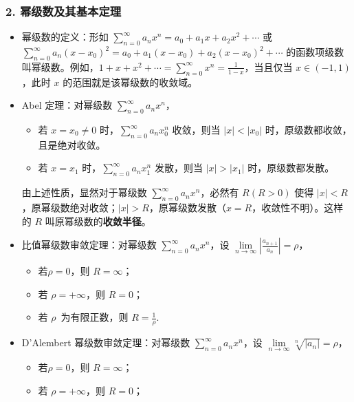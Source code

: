\documentclass[b5paper]{ctexart}
\newcommand{\mjst}{\sum \limits_{n = 0}^{\infty}}
\newcommand \jx[3]{\lim\limits_{#1 \to #2} #3}
\begin{document}
	\subsubsection*{2. 幂级数及其基本定理}
	
	\begin{itemize}
		\item 幂级数的定义：形如 $\mjst a_nx^n = a_0 + a_1 x + a_2 x^2 + \cdots$  或 $\mjst a_n (x - x_0 )^2 = a_0 + a_1 (x - x_0) + a_2 (x - x_0 )^2 + \cdots$ 的函数项级数叫幂级数。例如，$1 + x + x^2 + \cdots = \sum \limits_{n = 0}^{\infty} x^n = \frac{1}{1 - x}$，当且仅当 $x \in (-1, 1)$，此时 $x$ 的范围就是该幂级数的收敛域。
		
		\item Abel 定理：对幂级数 $\mjst a_n x^n$，
		
		\begin{itemize}
			\item 若 $x = x_0 \ne 0$ 时，$\mjst a_n x_0^n$ 收敛，则当 $|x| < |x_0|$ 时，原级数都收敛，且是绝对收敛。
			
			\item 若 $x = x_1$ 时，$\mjst a_n x_1^n$ 发散，则当 $|x| > |x_1|$ 时，原级数都发散。
		\end{itemize}
		
		由上述性质，显然对于幂级数 $\mjst a_n x^n$，必然有 $R(R > 0)$ 使得 $|x| < R$，原幂级数绝对收敛；$|x| > R$，原幂级数发散（$x = R$，收敛性不明）。这样的 $R$ 叫原幂级数的\textbf{收敛半径}。
		
		\item 比值幂级数审敛定理：对幂级数 $\mjst a_n x^n$，设 $\jx{n}{\infty}{|\frac{a_{n + 1}}{a_n}|} = \rho$，
			\begin{itemize}
				\item 若$\rho = 0$，则 $R = \infty$；
				
				\item 若 $\rho = +\infty$，则 $R = 0$；
				
				\item 若 $\rho  \enspace \mbox{为有限正数}$，则 $R = \frac{1}{\rho}$.
			\end{itemize}
		
		\item D'Alembert 幂级数审敛定理：对幂级数 $\mjst a_n x^n$，设 $\jx{n}{\infty}{\sqrt[n]{|a_n|}} = \rho$，
			\begin{itemize}
				\item 若$\rho = 0$，则 $R = \infty$；
				
				\item 若 $\rho = +\infty$，则 $R = 0$；
				

\end{itemize}
\end{itemize}
\end{document}
